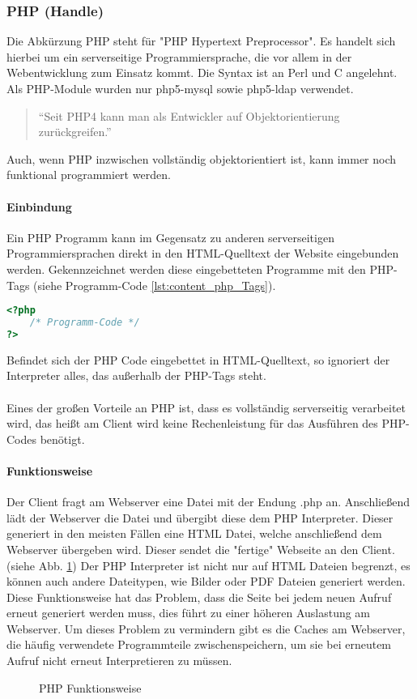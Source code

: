 \subsubsection{PHP (Handle)}
Die Abkürzung PHP steht für "PHP Hypertext Preprocessor". Es handelt sich hierbei um ein serverseitige Programmiersprache, die vor allem in der Webentwicklung zum Einsatz kommt. Die Syntax ist an Perl und C angelehnt.\\
Als PHP-Module wurden nur php5-mysql sowie php5-ldap verwendet.\\
\begin{quote}
\enquote{Seit PHP4 kann man als Entwickler auf Objektorientierung zurückgreifen.} \cite[S. 231]{php5}
\end{quote}
Auch, wenn PHP inzwischen vollständig objektorientiert ist, kann immer noch funktional programmiert werden.
\paragraph{Einbindung\\}
Ein PHP Programm kann im Gegensatz zu anderen serverseitigen Programmiersprachen direkt in den HTML-Quelltext der Website eingebunden werden. Gekennzeichnet werden diese eingebetteten Programme mit den PHP-Tags (siehe Programm-Code \ref{lst:content_php_Tags}).\\
\begin{lstlisting}[style=custom, language=PHP,  caption={PHP-Tags},label={lst:content_php_Tags}]
<?php 
	/* Programm-Code */
?>
\end{lstlisting}
Befindet sich der PHP Code eingebettet in HTML-Quelltext, so ignoriert der Interpreter alles, das außerhalb der PHP-Tags steht.\\\\
Eines der großen Vorteile an PHP ist, dass es vollständig serverseitig verarbeitet wird, das heißt am Client wird keine Rechenleistung für das Ausführen des PHP-Codes benötigt.
\paragraph{Funktionsweise}
Der Client fragt am Webserver eine Datei mit der Endung .php an. Anschließend lädt der Webserver die Datei und übergibt diese dem PHP Interpreter. Dieser generiert in den meisten Fällen eine HTML Datei, welche anschließend dem Webserver übergeben wird. Dieser sendet die "fertige" Webseite an den Client. (siehe Abb. \ref{fig:content_php_PHP_Funktion}) Der PHP Interpreter ist nicht nur auf HTML Dateien begrenzt, es können auch andere Dateitypen, wie Bilder oder PDF Dateien generiert werden. Diese Funktionsweise hat das Problem, dass die Seite bei jedem neuen Aufruf erneut generiert werden muss, dies führt zu einer höheren Auslastung am Webserver. Um dieses Problem zu vermindern gibt es die Caches am Webserver, die häufig verwendete Programmteile zwischenspeichern, um sie bei erneutem Aufruf nicht erneut Interpretieren zu müssen.
\begin{figure}[H]
\centering
{}
\caption{PHP Funktionsweise}
\label{fig:content_php_PHP_Funktion}
\end{figure}
